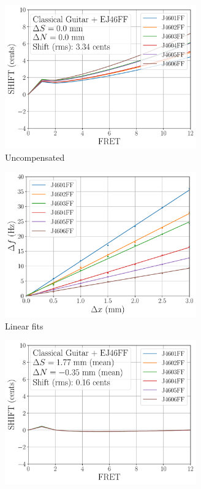 \begin{figure}
   \centering
   \begin{subfigure}[b]{0.46\textwidth}
    \centering
    \includegraphics[width=3.25in]{../figures/shift_classicalguitar_ej46ff_null}
    \caption{Uncompensated}
    \label{fig:shift_classicalguitar_ej46ff_null}
   \end{subfigure}
   \hspace{0.25in}
   \begin{subfigure}[b]{0.46\textwidth}
    \centering
    \includegraphics[width=3.25in]{../figures/fit_ej46ff}
    \caption{Linear fits}
    \label{fig:fit_ej46ff}
   \end{subfigure}
   \par\vspace{0.25in}
   \begin{subfigure}[b]{0.46\textwidth}
    \centering
    \includegraphics[width=3.25in]{../figures/shift_classicalguitar_ej46ff_full}

\end{subfigure}
\end{figure}
